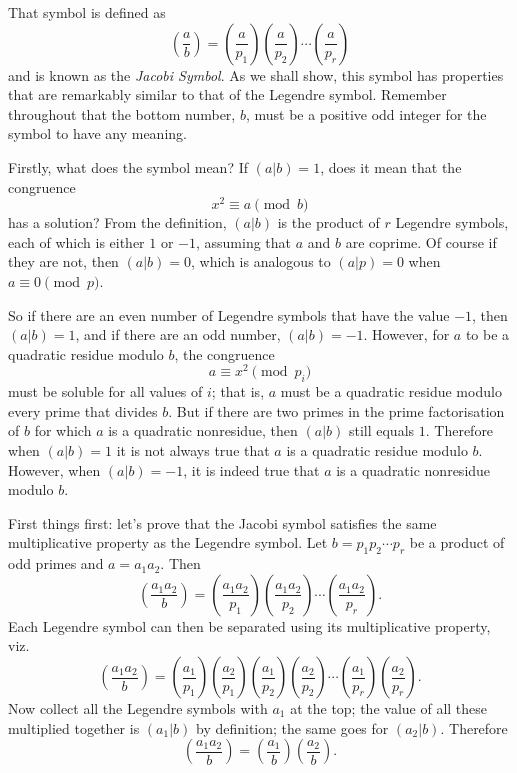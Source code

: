 \documentclass[a4paper]{article}
\newcommand{\leg}[2]{\left(\frac{#1}{#2}\right)}
\newcommand{\ileg}[2]{(#1|#2)}
\begin{document}
That symbol is defined as 
\[\leg{a}{b}=\leg{a}{p_1}\leg{a}{p_2}\cdots\leg{a}{p_r}\]
and is known as the \emph{Jacobi Symbol}. 
As we shall show, this symbol has properties that are remarkably similar
to that of the Legendre symbol.
Remember throughout that the bottom number, \(b\), must be a positive odd 
integer for the symbol to have any meaning.

Firstly, what does the symbol mean? If \(\ileg{a}{b}=1\), does it mean
that the congruence 
\[x^2\equiv a\pmod{b}\] has a solution?
From the definition, \(\ileg{a}{b}\) is the product of \(r\) Legendre symbols,
each of which is either \(1\) or \(-1\), assuming that \(a\) and \(b\) are
coprime. Of course if they are not, then \(\ileg{a}{b}=0\), which is
analogous to \(\ileg{a}{p}=0\) when \(a\equiv0\pmod{p}\).

So if there are an even number of Legendre symbols that have the value \(-1\),
then \(\ileg{a}{b}=1\), and if there are an odd number, \(\ileg{a}{b}=-1\).
However, for \(a\) to be a quadratic residue modulo \(b\), the congruence
\[a\equiv x^2\pmod{p_i}\] must be soluble for all values of \(i\); that is, \(a\) must be
a quadratic residue modulo every prime that divides \(b\). 
But if there are two primes in the prime factorisation of \(b\) for which
\(a\) is a quadratic nonresidue, then \(\ileg{a}{b}\) still equals \(1\).
Therefore when \(\ileg{a}{b}=1\) it is not always true that \(a\) is a quadratic
residue modulo \(b\). However, when \(\ileg{a}{b}=-1\), it is indeed true
that \(a\) is a quadratic nonresidue modulo \(b\).

First things first: let's prove that the Jacobi symbol satisfies the same
multiplicative property as the Legendre symbol. Let \(b=p_1p_2\cdots p_r\) be
a product of odd primes and \(a=a_1a_2\). Then
\[\leg{a_1a_2}{b}=\leg{a_1a_2}{p_1}\leg{a_1a_2}{p_2}\cdots\leg{a_1a_2}{p_r}.\]
Each Legendre symbol can then be separated using its multiplicative property, viz.
\[\leg{a_1a_2}{b}=\leg{a_1}{p_1}\leg{a_2}{p_1}\leg{a_1}{p_2}\leg{a_2}{p_2}\cdots\leg{a_1}{p_r}\leg{a_2}{p_r}.\]
Now collect all the Legendre symbols with \(a_1\) at the top; the value of
all these multiplied together is \(\ileg{a_1}{b}\) by definition; the same goes
for \(\ileg{a_2}{b}.\) Therefore
\[\leg{a_1a_2}{b}=\leg{a_1}{b}\leg{a_2}{b}.\]
\end{document}
